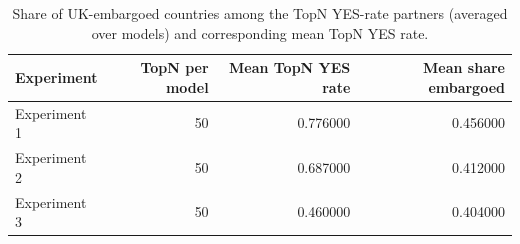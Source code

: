 \begin{table}[t]
\centering
\small
\begin{tabular}{lrrr}
\toprule
Experiment & TopN per model & Mean TopN YES rate & Mean share embargoed \\
\midrule
Experiment 1 & 50 & 0.776000 & 0.456000 \\
Experiment 2 & 50 & 0.687000 & 0.412000 \\
Experiment 3 & 50 & 0.460000 & 0.404000 \\
\bottomrule
\end{tabular}

\caption{Share of UK-embargoed countries among the TopN YES-rate partners (averaged over models) and corresponding mean TopN YES rate.}
\label{tab:embargo_overlap}
\end{table}
